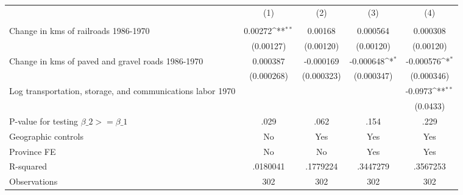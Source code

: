 {
\def\sym#1{\ifmmode^{#1}\else\(^{#1}\)\fi}
\begin{tabular}{l*{4}{c}}
\hline\hline
                &\multicolumn{1}{c}{(1)}&\multicolumn{1}{c}{(2)}&\multicolumn{1}{c}{(3)}&\multicolumn{1}{c}{(4)}\\
                &\multicolumn{1}{c}{}&\multicolumn{1}{c}{}&\multicolumn{1}{c}{}&\multicolumn{1}{c}{}\\
\hline
Change in kms of railroads 1986-1970&  0.00272\sym{**} &  0.00168         & 0.000564         & 0.000308         \\
                &(0.00127)         &(0.00120)         &(0.00120)         &(0.00120)         \\
[1em]
Change in kms of paved and gravel roads 1986-1970& 0.000387         &-0.000169         &-0.000648\sym{*}  &-0.000576\sym{*}  \\
                &(0.000268)         &(0.000323)         &(0.000347)         &(0.000346)         \\
[1em]
Log transportation, storage, and communications labor 1970&                  &                  &                  &  -0.0973\sym{**} \\
                &                  &                  &                  & (0.0433)         \\
\hline
P-value for testing $\beta\_{2} >= \beta\_{1}$&     .029         &     .062         &     .154         &     .229         \\
Geographic controls&       No         &      Yes         &      Yes         &      Yes         \\
Province FE     &       No         &       No         &      Yes         &      Yes         \\
R-squared       & .0180041         & .1779224         & .3447279         & .3567253         \\
Observations    &      302         &      302         &      302         &      302         \\
\hline\hline
\end{tabular}
}
